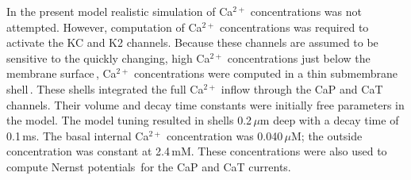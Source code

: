 \documentclass[12pt]{article}
\begin{document}
In the present model realistic simulation of Ca$^{2+}$ concentrations was not attempted. However, computation of Ca$^{2+}$ concentrations was required to activate the
KC and K2 channels. Because these channels are assumed to be
sensitive to the quickly changing, high Ca$^{2+}$ concentrations just
below the membrane surface\,\cite{L:1989ff}, Ca$^{2+}$ concentrations were 
computed in a thin submembrane shell\,\cite{D:1982lh}. These shells integrated the full Ca$^{2+}$ inflow through
the CaP and CaT channels. Their volume and decay time constants
were initially free parameters in the model. The model tuning
resulted in shells 0.2\,$\mu$m deep with a decay time of 0.1\,ms.
The basal internal Ca$^{2+}$ concentration was 0.040\,$\mu$M; the outside
concentration was constant at 2.4\,mM. These concentrations
were also used to compute Nernst potentials\,\cite{B:1991zr} for the
CaP and CaT currents.



\end{document}
